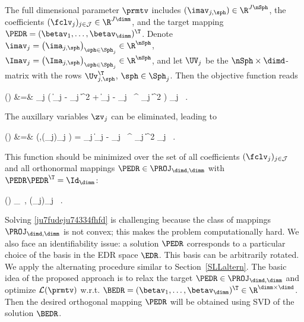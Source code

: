 The full dimensional parameter \( \prmtv \) includes
\( (\imav_{j,\sph}) \in \R^{\nJJJ \nSph} \), 
the coefficients \( (\fclv_{j})_{j \in \JJJ} \in \R^{\nJJJ\dimm} \),
and the target mapping \( \PEDR = (\betav_{1},\ldots,\betav_{\dimm})^{\T} \).
Denote \( \imav_{j} = \bigl( \ima_{j,\sph} \bigr)_{\sph \in \Sph_{j}} \in \R^{\nSph} \), 
\( \Imav_{j} = \bigl( \Ima_{j,\sph} \bigr)_{\sph \in \Sph_{j}} \in \R^{\nSph} \),
and let \( \UV_{j} \) be the \( \nSph \times \dimd \)-matrix with the rows \( \Uv_{j,\sph}^{\T} \),
\( \sph \in \Sph_{j} \).
Then the objective function reads
\begin{EQA}
	\LL(\prmtv)
	&=&
	 \sum_{j \in \JJJ} \Bigl( \| \Imav_{j} - \imav_{j} \|^{2} 
		+ \bigl\| \imav_{j} - \UV_{j} \, \PEDR^{\T} \fclv_{j} \bigr\|^{2} \Bigr) \neff_{j}
	\, .
	\qquad
\end{EQA}
The auxillary variables \( \zv_{j} \) can be eliminated, leading to
\begin{EQA}[rcl]
	\LL(\prmtv)
	&=&
	\LL(\PEDR,(\fclv_{j})_{j \in \JJJ})
	=
	 \sum_{j \in \JJJ} \bigl\| \Imav_{j} - \UV_{j} \, \PEDR^{\T} \fclv_{j} \bigr\|^{2} \neff_{j}
	\, .
	\qquad
\label{gtgyuy6ew5dtde32322jtmiG0}	
\end{EQA}
This function should be minimized over the set of all coefficients \( (\fclv_{j})_{j \in \JJJ} \) and all
orthonormal mappings \( \PEDR \in \PROJ_{\dimd,\dimm} \) with \( \PEDR \PEDR^{\T} = \Id_{\dimm} \):
\begin{EQA}[c]
	\LL(\prmtv)
	\to
	\inf_{\PEDR \, , (\fclv_{j})_{j \in \JJJ}} 
	\, .
\label{ju7fudeju74334fhfd}
\end{EQA}

\label{SaltMI}
Solving \eqref{ju7fudeju74334fhfd} is challenging because
the class of mappings \( \PROJ_{\dimd,\dimm} \) is not convex; this makes the problem computationally hard.
We also face an identifiability issue: a solution \( \PEDR \) corresponds to 
a particular choice of the basis in the EDR space \( \EDR \).
This basis can be arbitrarily rotated.
We apply the alternating procedure similar to Section~\ref{SLLaltern}.
The basic idea of the proposed approach is to relax the target \( \PEDR \in \PROJ_{\dimd,\dimm} \)
and optimize \( \LL(\prmtv) \) w.r.t. 
\( \BEDR = (\betav_{1},\ldots,\betav_{\dimm})^{\T} \in \R^{\dimm \times \dimd} \). 
Then the desired orthogonal mapping \( \PEDR \) will be obtained using SVD 
of the solution \( \BEDR \).
%

